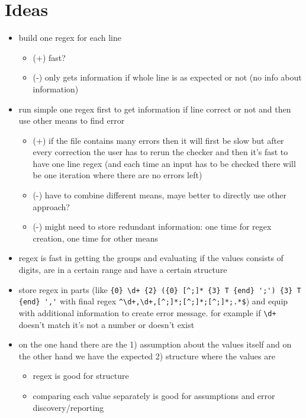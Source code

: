 \documentclass[11pt]{article}
\begin{document}

\section{Ideas}

\begin{itemize}
\item build one regex for each line
\begin{itemize}
\item (+) fast?
\item (-) only gets information if whole line is as expected or not (no info about information)
\end{itemize}

\item run simple one regex first to get information if line correct or not and then use other means to find error
\begin{itemize}
\item (+) if the file contains many errors then it will first be slow but after every correction the user has to rerun the checker and then it's fast to have one line regex (and each time an input has to be checked there will be one iteration where there are no errors left)
\item (-) have to combine different means, maye better to directly use other approach?
\item (-) might need to store redundant information: one time for regex creation, one time for other means
\end{itemize}

\item regex is fast in getting the groups and evaluating if the values consists of digits, are in a certain range and have a certain structure

\item store regex in parts (like \verb|{0} \d+ {2} ({0} [^;]* {3} T {end} ';') {3} T {end} ','| with final regex \verb|^\d+,\d+,[^;]*;[^;]*;[^;]*;.*$|) and equip with additional information to create error message. for example if \verb|\d+| doesn't match it's not a number or doesn't exist

\item on the one hand there are the 1) assumption about the values itself and on the other hand we have the expected 2) structure where the values are
\begin{itemize}
\item regex is good for structure
\item comparing each value separately is good for assumptions and error discovery/reporting
\end{itemize}


\end{itemize}
\end{document}

